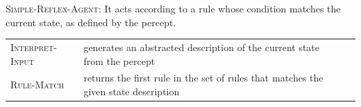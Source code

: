 \vspace{0.5cm}


\begin{algorithm}[H]
    \caption{\textsc{Simple-Reflex-Agent}: It acts according to a rule whose condition matches the current state, as defined by the percept. \cite{ai/book/Artificial-Intelligence-A-Modern-Approach/Russell-Norvig}}

\end{algorithm}

\vspace{0.3cm}

\begin{customArrayStretch}{1.2}
\begin{longtable}{l p{12cm} l}

\textsc{Interpret-Input} & 
    generates an abstracted description of the current state from the percept &
    \cite{ai/book/Artificial-Intelligence-A-Modern-Approach/Russell-Norvig} \\

\textsc{Rule-Match} & 
    returns the first rule in the set of rules that matches the given state description &
    \cite{ai/book/Artificial-Intelligence-A-Modern-Approach/Russell-Norvig} \\

\end{longtable}
\end{customArrayStretch}









